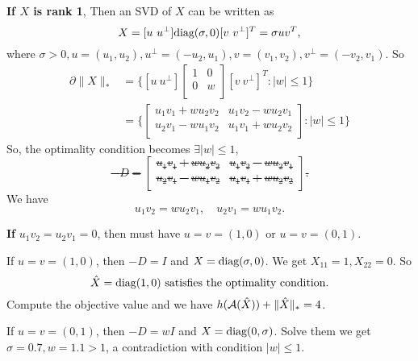 \textbf{If $X$ is rank 1},
Then an SVD of $X$ can be written as
\begin{equation}
    X=[u\ u^\perp] {\text{diag}}(\sigma,0) [v\ v^\perp]^T = \sigma uv^T,
\end{equation}
where $\sigma>0, u=(u_1,u_2), u^\perp=(-u_2,u_1), v=(v_1,v_2), v^\perp=(-v_2,v_1)$.
So
\begin{equation}
\begin{split}
    \partial\|X\|_*
        &=\bigg\{[u\ u^\perp]
            \begin{bmatrix}
                1 & 0    \\
                0 & w \\
            \end{bmatrix}
            [v\ v^\perp]^T:|w|\le1\bigg\} \\
        &=\bigg\{
            \begin{bmatrix}
                u_1v_1+wu_2v_2 & u_1v_2-wu_2v_1 \\
                u_2v_1-wu_1v_2 & u_1v_1+wu_2v_2 \\
            \end{bmatrix}
            :|w|\le1\bigg\}
\end{split}
\end{equation}
So, the optimality condition becomes $\exists |w|\le1$, \st
\begin{equation}
    -D=\begin{bmatrix}
            u_1v_1+wu_2v_2 & u_1v_2-wu_2v_1 \\
            u_2v_1-wu_1v_2 & u_1v_1+wu_2v_2 \\
        \end{bmatrix}.
\end{equation}
We have
\begin{equation}
u_1v_2=wu_2v_1,\quad u_2v_1=wu_1v_2.
\end{equation}

\textbf{If} $u_1v_2=u_2v_1=0$,
then must have $u=v=(1,0)$ or $u=v=(0,1)$.

If $u=v=(1,0)$,
then $-D=I$ and $X={\text{diag}}(\sigma,0)$.
We get $X_{11}=1,X_{22}=0$.
So
\begin{equation}
    \hat X={\text{diag}}(1,0) \text{ satisfies the optimality condition}.
\end{equation}
Compute the objective value and we have
$h(\mathcal{A}(\hat X))+\|\hat X\|_*=4$.

If $u=v=(0,1)$,
then $-D=wI$ and $X={\text{diag}}(0,\sigma)$.
Solve them we get $\sigma=0.7, w=1.1>1$,
a contradiction with condition $|w|\le1$.

